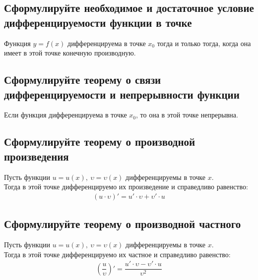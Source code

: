 \newpage
\subsection{Сформулируйте необходимое и достаточное условие дифференцируемости функции в точке}
\begin{theorem}
	Функция $y=f(x)$ дифференцируема в точке $x_0$ тогда и только тогда, когда она имеет в этой точке конечную производную.
\end{theorem}

\subsection{Сформулируйте теорему о связи дифференцируемости и непрерывности функции}
\begin{theorem} 
	Если функция дифференцируема в точке $x_0$, то она в этой точке непрерывна.
\end{theorem}

\subsection{Сформулируйте теорему о производной произведения}
\begin{theorem}
	Пусть функции $u = u(x),\ \upsilon = \upsilon (x)$ дифференцируемы в точке $x$.\\
	Тогда в этой точке дифференцируемо их произведение и справедливо равенство:
	\begin{gather*}
		(u \cdot \upsilon)' = u'\cdot \upsilon + \upsilon' \cdot u
	\end{gather*}
\end{theorem}

\subsection{Сформулируйте теорему о производной частного}
\begin{theorem}
	Пусть функции $u = u(x),\ \upsilon = \upsilon (x)$ дифференцируемы в точке $x$.\\
	Тогда в этой точке дифференцируемо их частное и справедливо равенство:
	\begin{gather*}
		\left(\dfrac{u}{\upsilon}\right)' = \dfrac{u' \cdot \upsilon - \upsilon' \cdot u}{\upsilon^2}
	\end{gather*}
\end{theorem}

